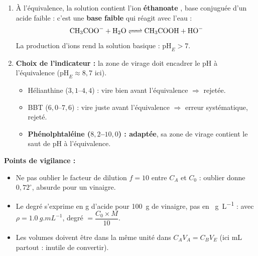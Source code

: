\documentclass[11pt]{article}
\begin{document}
\begin{corrige}
\begin{enumerate}
\item À l'équivalence, la solution contient l'ion \textbf{éthanoate }, base conjuguée d'un acide faible : c'est une \textbf{base faible} qui réagit avec l'eau :
\[ \ce{CH3COO- + H2O <=> CH3COOH + HO-} \]
La production d'ions  rend la solution basique : $\mathrm{pH}_E > 7$.

\item \textbf{Choix de l'indicateur :} la zone de virage doit encadrer le pH à l'équivalence ($\mathrm{pH}_E \approx 8{,}7$ ici).
\begin{itemize}
\item Hélianthine ($3{,}1$--$4{,}4$) : vire bien avant l'équivalence $\Rightarrow$ rejetée.
\item BBT ($6{,}0$--$7{,}6$) : vire juste avant l'équivalence $\Rightarrow$ erreur systématique, rejeté.
\item \textbf{Phénolphtaléine ($8{,}2$--$10{,}0$) : adaptée}, sa zone de virage contient le saut de pH à l'équivalence.
\end{itemize}
\end{enumerate}

\textbf{Points de vigilance :}
\begin{itemize}
\item Ne pas oublier le facteur de dilution $f = 10$ entre $C_A$ et $C_0$ : oublier donne $0{,}72^{\circ}$, absurde pour un vinaigre.
\item Le degré s'exprime en g d'acide pour \SI{100}{g} de vinaigre, pas en \SI{}{g.L^{-1}} : avec $\rho = \SI{1,0}{g.mL^{-1}}$, degré $= \dfrac{C_0 \times M}{10}$.
\item Les volumes doivent être dans la même unité dans $C_A V_A = C_B V_E$ (ici mL partout : inutile de convertir).
\end{itemize}
\end{corrige}
\end{document}
